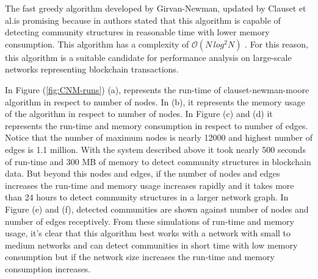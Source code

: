 
The fast greedy algorithm developed by Girvan-Newman, updated by Clauset et al.is promising because in \cite{ref-31} authors stated that this algorithm is capable of detecting community structures in reasonable time with lower memory consumption. This algorithm has a complexity of $\mathcal{O}(N\,log^2N)$ \cite{ref-51}. For this reason, this algorithm is a suitable candidate for performance analysis on large-scale networks representing blockchain transactions.

In Figure (\ref{fig:CNM-runs}) (a), represents the run-time of clauset-newman-moore algorithm in respect to number of nodes. In (b), it represents the memory usage of the algorithm in respect to number of nodes. In Figure (c) and (d) it represents the run-time and memory consumption in respect to number of edges. Notice that the number of maximum nodes is nearly 12000 and highest number of edges is 1.1 million. With the system described above it took nearly 500 seconds of run-time and 300 MB of memory to detect community structures in blockchain data. But beyond this nodes and edges, if the number of nodes and edges increases the run-time and memory usage increases rapidly and it takes more than 24 hours to detect community structures in a larger network graph. In Figure (e) and (f), detected communities are shown against number of nodes and number of edges receptively. From these simulations of run-time and memory usage, it's clear that this algorithm best works with a network with small to medium networks and can detect communities in short time with low memory consumption but if the network size increases the run-time and memory consumption increases.
\vfill
\pagebreak

